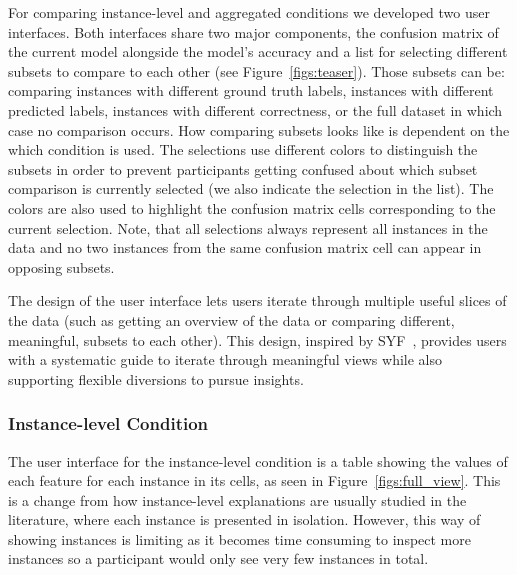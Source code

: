 For comparing instance-level and aggregated conditions we developed two user interfaces.
Both interfaces share two major components,
the confusion matrix of the current model alongside the model's accuracy and a list for selecting different subsets to compare to each other (see Figure~\ref{figs:teaser}).
Those subsets can be: comparing instances with different ground truth labels, instances with different predicted labels, instances with different correctness, or the full dataset in which case no comparison occurs.
How comparing subsets looks like is dependent on the which condition is used.
The selections use different colors to distinguish the subsets in order to prevent participants getting confused about which subset comparison is currently selected (we also indicate the selection in the list).
The colors are also used to highlight the confusion matrix cells corresponding to the current selection.
Note, that all selections always represent all instances in the data and no two instances from the same confusion matrix cell can appear in opposing subsets.

The design of the user interface lets users iterate through multiple useful slices of the data (such as getting an overview of the data or comparing different, meaningful, subsets to each other).
This design, inspired by SYF~\cite{perer2008systematic}, provides users with a systematic guide to iterate through meaningful views while also supporting flexible diversions to pursue insights.

\subsubsection{Instance-level Condition}
The user interface for the instance-level condition is a table showing the values of each feature for each instance in its cells, as seen in Figure~\ref{figs:full_view}.
This is a change from how instance-level explanations are usually studied in the literature, where each instance is presented in isolation.
However, this way of showing instances is limiting as it becomes time consuming to inspect more instances so a participant would only see very few instances in total.

